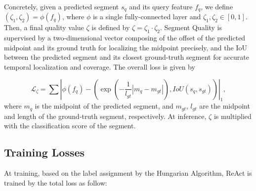 \documentclass[runningheads]{llncs}
\newcommand{\mc}[1]{\mathcal{#1}}
\def\name{ReAct }
\def\score{Segment Quality }
\begin{document}
Concretely, given a predicted segment $s_q$ and its query feature $f_q$, we define $(\zeta_{1}, \zeta_{2})=\phi(f_q)$, where $\phi$ is a single fully-connected layer and $\zeta_{1}, \zeta_{2} \in[0,1]$. Then, a final quality value $\zeta$ is defined by $\zeta = \zeta_{1} \cdot \zeta_{2}$. \score is supervised by a two-dimensional vector composing of the offset of the predicted midpoint and its ground truth for localizing the midpoint precisely, and the IoU between the predicted segment and its closest ground-truth segment for accurate temporal localization and coverage. The overall loss is given by       





\begin{equation}
    \mc{L}_\zeta=\sum{\left| {\phi(f_q)-(\exp({-\frac{1}{{l_{gt}}}{|m_q-m_{gt}|} }), IoU(s_q,s_{gt}))} \right|_1},
\end{equation}where $m_q$ is the midpoint of the predicted segment, and $m_{gt}$, $l_{gt}$ are the midpoint and length of the ground-truth segment, respectively. At inference, $\zeta$ is multiplied with the classification score of the segment.





\subsection{Training Losses}
At training, based on the label assignment by the Hungarian Algorithm, \name is trained by the total loss as follow: 
\end{document}
